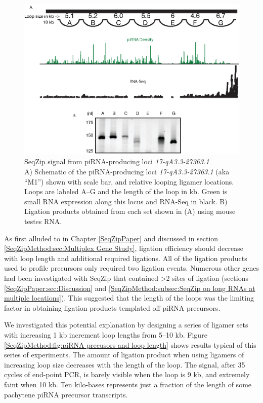     \begin{figure} %
        \centering 
        \includegraphics{Figures/SeqZipMethod/piRNAPrecurserAnalyisBySeqZip.eps}
        \caption[SeqZip signal from piRNA-producing loci \textit{17-qA3.3-27363.1}]
        {
          SeqZip signal from piRNA-producing loci \textit{17-qA3.3-27363.1}\\[0.25cm]
          A) Schematic of the piRNA-producing loci \textit{17-qA3.3-27363.1} (aka ``M1'') shown with scale bar, and relative looping ligamer locations.  Loops are labeled A--G and the length of the loop in kb.  Green is small RNA expression along this locus and RNA-Seq in black. B) Ligation products obtained from each set shown in (A) using mouse testes RNA.
        	}
        \label{SeqZipMethod:fig:M1 analysis by SeqZip}
      	\end{figure}
          
    As first alluded to in Chapter \ref{SeqZipPaper} and discussed in section \ref{SeqZipMethod:sec:Multiplex Gene Study}, ligation efficiency should decrease with loop length and additional required ligations. All of the ligation products used to profile precursors only required two ligation events. Numerous other genes had been investigated with SeqZip that contained >2 sites of ligation (sections \ref{SeqZipPaper:sec:Discussion} and \ref{SeqZipMethod:subsec:SeqZip on long RNAs at multiple locations}). This suggested that the length of the loops was the limiting factor in obtaining ligation products templated off piRNA precursors.

    We investigated this potential explanation by designing a series of ligamer sets with increasing 1 kb increment loop lengths from 5--10 kb. Figure \ref{SeqZipMethod:fig:piRNA precusors and loop length} shows results typical of this series of experiments. The amount of ligation product when using ligamers of increasing loop size decreases with the length of the loop. The signal, after 35 cycles of end-point PCR, is barely visible when the loop is 9 kb, and extremely faint when 10 kb. Ten kilo-bases represents just a fraction of the length of some pachytene piRNA precursor transcripts. 

